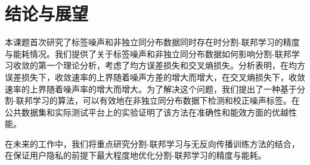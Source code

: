 \chapter{结论与展望}

本课题首次研究了标签噪声和非独立同分布数据同时存在时分割-联邦学习的精度与能耗情况。我们提供了关于标签噪声和非独立同分布数据如何影响分割-联邦学习收敛的第一个理论分析，考虑了均方误差损失和交叉熵损失。分析表明，在均方误差损失下，收敛速率的上界随着噪声方差的增大而增大，在交叉熵损失下，收敛速率的上界随着噪声率的增大而增大。为了解决这个问题，我们提出了一种基于分割-联邦学习的算法，可以有效地在非独立同分布数据下检测和校正噪声标签。在公共数据集和实际测试平台上的实验证明了该方法在准确性和能效方面的优越性能。

在未来的工作中，我们将重点研究分割-联邦学习与无反向传播训练方法的结合，在保证用户隐私的前提下最大程度地优化分割-联邦学习的精度与能耗。